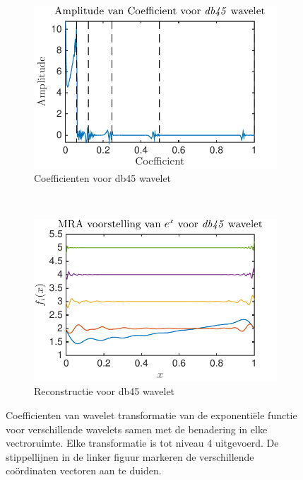 \begin{figure}
\begin{subfigure}[b]{0.4\textwidth}
        \includegraphics[width=\textwidth]{../src/denoising/db45_noNoise/coef_exp_db45_4}
        \caption{Coefficienten voor db45 wavelet}
        \label{fig:tiger}
    \end{subfigure}
    ~ %
    \begin{subfigure}[b]{0.4\textwidth}
        \includegraphics[width=\textwidth]{../src/denoising/db45_noNoise/MRA_exp_db45_4}
        \caption{Reconstructie voor db45 wavelet}
        \label{fig:mouse}
    \end{subfigure}
    \caption{Coefficienten van wavelet transformatie van de exponenti\"ele functie voor verschillende wavelets samen met de benadering in elke vectroruimte. Elke transformatie is tot niveau 4 uitgevoerd. De stippellijnen in de linker figuur markeren de verschillende co\"ordinaten vectoren aan te duiden.}\label{fig:exp_noNoise}
\end{figure}



